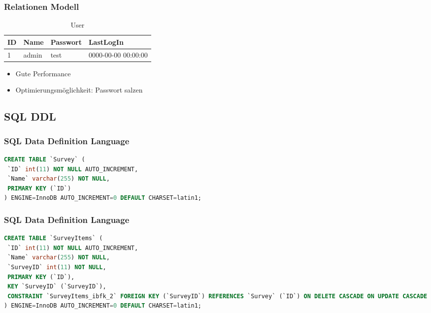 \documentclass[xcolor=dvipsnames]{beamer}
\begin{document}
\begin{frame} %
  \frametitle{Relationen Modell} %

\begin{table}
\begin{tabular}{|l|l|l|l|} \hline\hline
\textbf{ID} & \textbf{Name}  & \textbf{Passwort} & \textbf{LastLogIn}\\
\hline
1 & admin & test & 0000-00-00 00:00:00 \\
\hline\hline
\end{tabular}
  \caption{User}
  \end{table}

	\begin{block}{}		
		\begin{itemize}[]
			\item Gute Performance 
			\item Optimierungsmöglichkeit: Passwort salzen
		\end{itemize}
	\end{block}

\end{frame}


\subsection{SQL DDL}
\begin{frame}[fragile] %
\frametitle{SQL Data Definition Language} %

\begin{lstlisting}[language=SQL, caption=Survey]
CREATE TABLE `Survey` (
 `ID` int(11) NOT NULL AUTO_INCREMENT,
 `Name` varchar(255) NOT NULL,
 PRIMARY KEY (`ID`)
) ENGINE=InnoDB AUTO_INCREMENT=0 DEFAULT CHARSET=latin1;
\end{lstlisting} 
\end{frame}

\begin{frame}[fragile] %
\frametitle{SQL Data Definition Language} %

\begin{lstlisting}[language=SQL, caption=SurveyItems]
CREATE TABLE `SurveyItems` (
 `ID` int(11) NOT NULL AUTO_INCREMENT,
 `Name` varchar(255) NOT NULL,
 `SurveyID` int(11) NOT NULL,
 PRIMARY KEY (`ID`),
 KEY `SurveyID` (`SurveyID`),
 CONSTRAINT `SurveyItems_ibfk_2` FOREIGN KEY (`SurveyID`) REFERENCES `Survey` (`ID`) ON DELETE CASCADE ON UPDATE CASCADE
) ENGINE=InnoDB AUTO_INCREMENT=0 DEFAULT CHARSET=latin1;
\end{lstlisting} 
\end{frame}
\end{document}
